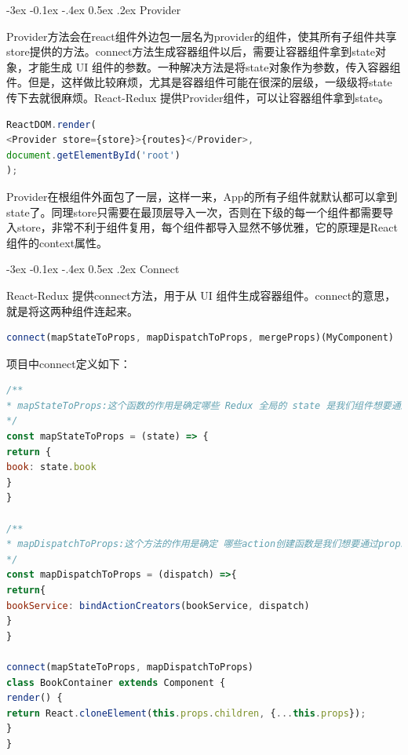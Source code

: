 \documentclass[11pt,fleqn]{book}
\makeatletter
\numberwithin{dummy}{section}
\theoremstyle{ocrenumbox}
\theoremstyle{blacknumex}
\theoremstyle{blacknumbox}
\theoremstyle{ocrenum}
\renewcommand{\subsection}{\@startsection {subsection}{2}{\z@}
	{-3ex \@plus -0.1ex \@minus -.4ex}
	{0.5ex \@plus.2ex }
	{\normalfont\sffamily\bfseries}}
\makeatother
\begin{document}
\subsection{Provider}

Provider方法会在react组件外边包一层名为provider的组件，使其所有子组件共享store提供的方法。connect方法生成容器组件以后，需要让容器组件拿到state对象，才能生成 UI 组件的参数。一种解决方法是将state对象作为参数，传入容器组件。但是，这样做比较麻烦，尤其是容器组件可能在很深的层级，一级级将state传下去就很麻烦。React-Redux 提供Provider组件，可以让容器组件拿到state。

\begin{lstlisting}[language=Javascript]
ReactDOM.render(
<Provider store={store}>{routes}</Provider>,
document.getElementById('root')
);
\end{lstlisting}

Provider在根组件外面包了一层，这样一来，App的所有子组件就默认都可以拿到state了。同理store只需要在最顶层导入一次，否则在下级的每一个组件都需要导入store，非常不利于组件复用，每个组件都导入显然不够优雅，它的原理是React组件的context属性。

\subsection{Connect}

React-Redux 提供connect方法，用于从 UI 组件生成容器组件。connect的意思，就是将这两种组件连起来。

\begin{lstlisting}[language=Javascript]
connect(mapStateToProps, mapDispatchToProps, mergeProps)(MyComponent)
\end{lstlisting}

项目中connect定义如下：

\begin{lstlisting}[language=Javascript]
/**
* mapStateToProps:这个函数的作用是确定哪些 Redux 全局的 state 是我们组件想要通过 props 获取
*/
const mapStateToProps = (state) => {
return {
book: state.book
}
}

/**
* mapDispatchToProps:这个方法的作用是确定 哪些action创建函数是我们想要通过props获取
*/
const mapDispatchToProps = (dispatch) =>{
return{
bookService: bindActionCreators(bookService, dispatch)
}
}

connect(mapStateToProps, mapDispatchToProps)
class BookContainer extends Component {
render() {
return React.cloneElement(this.props.children, {...this.props});
}
}
\end{lstlisting}
\end{document}
